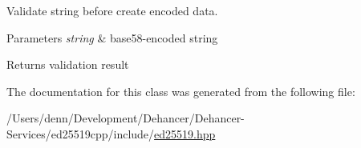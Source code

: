Validate string before create encoded data. 
\begin{DoxyParams}{Parameters}
{\em string} & base58-\/encoded string \\
\hline
\end{DoxyParams}
\begin{DoxyReturn}{Returns}
validation result 
\end{DoxyReturn}


The documentation for this class was generated from the following file\+:\begin{DoxyCompactItemize}
\item 
/\+Users/denn/\+Development/\+Dehancer/\+Dehancer-\/\+Services/ed25519cpp/include/\mbox{\hyperlink{ed25519_8hpp}{ed25519.\+hpp}}\end{DoxyCompactItemize}
